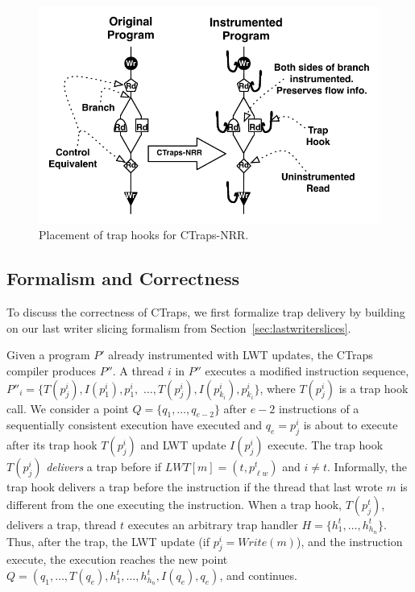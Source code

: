 \documentclass[preprint,9pt]{sigplanconf}
\newcommand{\ctraps}{CTraps\xspace}
\newcommand{\ctrapsmm}{CTraps-NRR\xspace}
\newcommand{\lwt}{LWT\xspace}
\begin{document}
\begin{figure}[htb]
\centering
\includegraphics[width=.9\columnwidth]{figs/CTMMHooks.pdf}
\caption{\label{fig:insthooks}Placement of trap hooks for \ctrapsmm.}
\end{figure}

\subsection{Formalism and Correctness}
\label{sec:ctsoundness}
To discuss the correctness of \ctraps, we first formalize trap delivery by
building on our last writer slicing formalism from
Section~\ref{sec:lastwriterslices}.  

Given a program $P'$ already instrumented with \lwt updates, the \ctraps
compiler produces $P''$. A thread $i$ in $P''$ executes a modified instruction
sequence, $P''_{i} = \{ T(p^{i}_{j}), I(p^{i}_{1}), p^{i}_{1},$ $\ldots,
T(p^{i}_{j}), I(p^{i}_{k_{i}}), p^{i}_{k_{i}} \}$, where $T(p^{i}_{j})$ is a
trap hook call.  We consider a point $Q = \{q_1, \ldots, q_{e-2}\}$ after $e-2$
instructions of a sequentially consistent execution have executed and $q_{e} =
p^{i}_{j}$ is about to execute after its trap hook $T(p^{i}_{j})$ and \lwt
update $I(p^{i}_{j})$ execute.  The trap hook $T(p^{i}_{j})$ {\em delivers} a
trap before if $LWT[m] = (t,p^{t}_{\ell w})$ and $i \ne t$.  Informally, the
trap hook delivers a trap before the instruction if the thread that last wrote
$m$ is different from the one executing the instruction.  When a trap hook,
$T(p^{t}_{j})$, delivers a trap, thread $t$ executes an arbitrary trap handler
$H = \{h^{t}_{1}, \ldots, h^{t}_{h_{n}}\}$.  Thus, after the trap, the \lwt
update (if $p^{i}_{j} = Write(m)$), and the instruction execute, the execution
reaches the new point $Q = (q_{1}, \ldots, T(q_{e}), h^{t}_{1}, \ldots,
h^{t}_{h_{n}}, I(q_{e}), q_{e})$, and continues.
\end{document}
